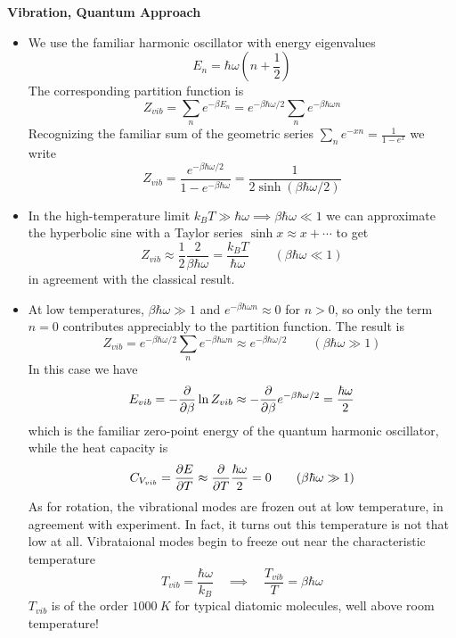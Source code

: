 \documentclass[11pt, a4paper]{article}
\begin{document}
\textbf{Vibration, Quantum Approach}
\begin{itemize}
	\item We use the familiar harmonic oscillator with energy eigenvalues
	\begin{equation*}
		E_{n} = \hbar \omega \left(n + \frac{1}{2}\right)
	\end{equation*}
	The corresponding partition function is
	\begin{equation*}
		Z_{vib} = \sum_{n} e^{-\beta E_{n}} = e^{-\beta \hbar \omega /2 } \sum_{n} e^{-\beta \hbar \omega n }
	\end{equation*}
	Recognizing the familiar sum of the geometric series $ \sum_{n}e^{-xn} = \frac{1}{1-e^{x}}$ we write
	\begin{equation*}
		Z_{vib} = \frac{e^{-\beta \hbar \omega /2 }}{1 - e^{-\beta \hbar \omega }} = \frac{1}{2 \sinh(\beta \hbar \omega / 2)}
	\end{equation*}
	
	\item In the high-temperature limit $ k_{B} T \gg \hbar \omega \implies \beta \hbar \omega \ll 1$  we can approximate the hyperbolic sine with a Taylor series $ \sinh x \approx x + \cdots $ to get
	\begin{equation*}
		Z_{vib} \approx \frac{1}{2} \frac{2}{\beta \hbar \omega} = \frac{k_{B}T}{\hbar \omega} \qquad (\beta \hbar \omega \ll 1)
	\end{equation*}
	in agreement with the classical result.
	
	\item At low temperatures, $ \beta \hbar \omega \gg 1 $ and $ e^{-\beta \hbar \omega n} \approx 0$ for $ n > 0 $, so only the term $ n = 0 $ contributes appreciably to the partition function. The result is
	\begin{equation*}
		Z_{vib} = e^{-\beta \hbar \omega /2 } \sum_{n} e^{-\beta \hbar \omega n } \approx  e^{-\beta \hbar \omega /2 }  \qquad (\beta \hbar \omega \gg 1)
	\end{equation*}
	In this case we have 
	\begin{equation*}
		E_{vib} = - \pdv{}{\beta} \ln Z_{vib}\approx - \pdv{}{\beta}e^{-\beta \hbar \omega /2 } = \frac{\hbar \omega}{2}
	\end{equation*}
	which is the familiar zero-point energy of the quantum harmonic oscillator, while the heat capacity is
	\begin{equation*}
		C_{V_{vib}} = \pdv{E}{T} \approx \pdv{}{T} \frac{\hbar \omega}{2} = 0 \qquad (\beta \hbar \omega \gg 1)
	\end{equation*}
	As for rotation, the vibrational modes are frozen out at low temperature, in agreement with experiment. In fact, it turns out this temperature is not that low at all. Vibrataional modes begin to freeze out near the characteristic temperature
	\begin{equation*}
		T_{vib} = \frac{\hbar \omega}{k_B} \quad \implies \quad \frac{T_{vib}}{T} = \beta \hbar \omega
	\end{equation*}
	$ T_{vib} $ is of the order $ \SI{1000}{K} $ for typical diatomic molecules, well above room temperature!
\end{itemize}
\end{document}

